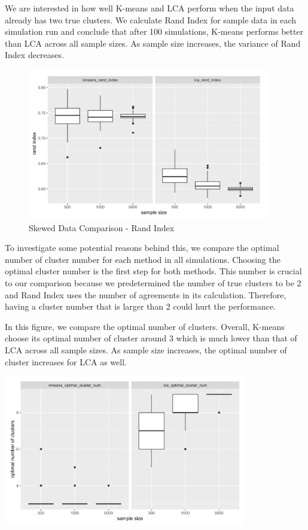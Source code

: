 \documentclass[
]{article}
\begin{document}
We are interested in how well K-means and LCA perform when the input
data already has two true clusters. We calculate Rand Index for sample
data in each simulation run and conclude that after 100 simulations,
K-means performs better than LCA across all sample sizes. As sample size
increases, the variance of Rand Index decreases.

\begin{figure}
\centering
\includegraphics[width=4.16667in,height=\textheight]{report_image/skewed_data_rand_index_results.png}
\caption{Skewed Data Comparison - Rand Index}
\end{figure}

To investigate some potential reasons behind this, we compare the
optimal number of cluster number for each method in all simulations.
Choosing the optimal cluster number is the first step for both methods.
This number is crucial to our comparison because we predetermined the
number of true clusters to be 2 and Rand Index uses the number of
agreements in its calculation. Therefore, having a cluster number that
is larger than 2 could hurt the performance.

In this figure, we compare the optimal number of clusters. Overall,
K-means choose its optimal number of cluster around 3 which is much
lower than that of LCA across all sample sizes. As sample size
increases, the optimal number of cluster increases for LCA as well.

\includegraphics[width=4.16667in,height=\textheight]{report_image/skewed_data_num_clusters_results.png}
\newpage
\end{document}
